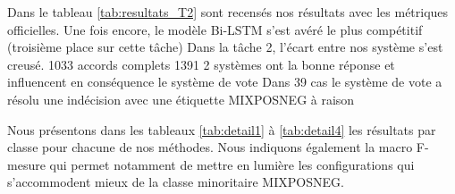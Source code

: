  Dans le tableau \ref{tab:resultats_T2} sont recensés nos résultats avec les métriques officielles.
 Une fois encore, le modèle Bi-LSTM s'est avéré le plus compétitif (troisième place sur cette tâche)
Dans la tâche 2, l'écart entre nos système s'est creusé.
1033 accords complets
1391 2 systèmes ont la bonne réponse et influencent en conséquence le système de vote
Dans 39 cas le système de vote a résolu une indécision avec une étiquette MIXPOSNEG à raison





Nous présentons dans les tableaux \ref{tab:detail1} à \ref{tab:detail4} les résultats par classe pour chacune de nos méthodes.
 Nous indiquons également la macro F-mesure qui permet notamment de mettre en lumière les configurations qui s'accommodent mieux de la classe minoritaire MIXPOSNEG.
